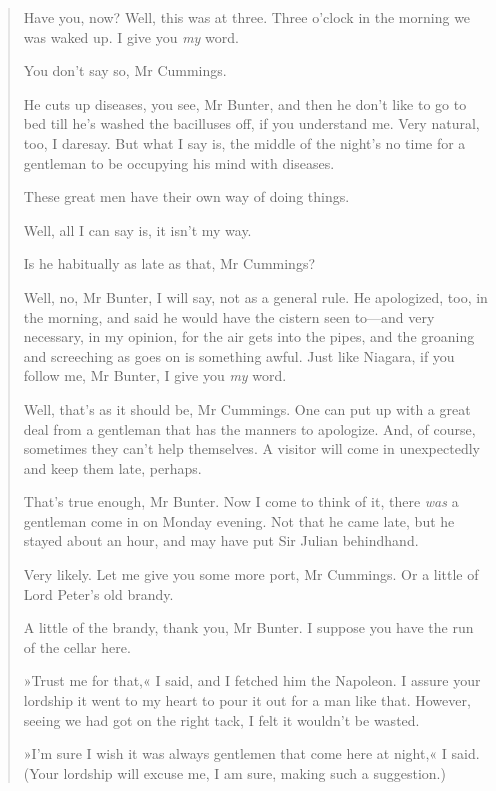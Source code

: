 \begin{quotation}
\begin{dialogue}
 Have you, now? Well, this was at three. Three o'clock in the morning we was waked up. I give you \textit{my} word.

 You don't say so, Mr Cummings.

 He cuts up diseases, you see, Mr Bunter, and then he don't like to go to bed till he's washed the bacilluses off, if you understand me. Very natural, too, I daresay. But what I say is, the middle of the night's no time for a gentleman to be occupying his mind with diseases.

 These great men have their own way of doing things.

 Well, all I can say is, it isn't my way.


 Is he habitually as late as that, Mr Cummings?

 Well, no, Mr Bunter, I will say, not as a general rule. He apologized, too, in the morning, and said he would have the cistern seen to—and very necessary, in my opinion, for the air gets into the pipes, and the groaning and screeching as goes on is something awful. Just like Niagara, if you follow me, Mr Bunter, I give you \textit{my} word.

 Well, that's as it should be, Mr Cummings. One can put up with a great deal from a gentleman that has the manners to apologize. And, of course, sometimes they can't help themselves. A visitor will come in unexpectedly and keep them late, perhaps.

 That's true enough, Mr Bunter. Now I come to think of it, there \textit{was} a gentleman come in on Monday evening. Not that he came late, but he stayed about an hour, and may have put Sir Julian behindhand.

 Very likely. Let me give you some more port, Mr Cummings. Or a little of Lord Peter's old brandy.

 A little of the brandy, thank you, Mr Bunter. I suppose you have the run of the cellar here. 
\end{dialogue}

»Trust me for that,« I said, and I fetched him the Napoleon. I assure your lordship it went to my heart to pour it out for a man like that. However, seeing we had got on the right tack, I felt it wouldn't be wasted.

»I'm sure I wish it was always gentlemen that come here at night,« I said. (Your lordship will excuse me, I am sure, making such a suggestion.)
\end{quotation}

